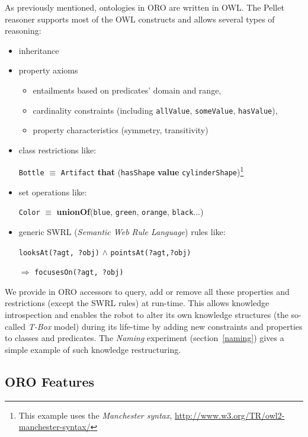 \documentclass{svmult}
\newcommand{\concept}[1]{{\footnotesize \texttt{#1}}}
\begin{document}
As previously mentioned, ontologies in ORO are written in OWL. The
Pellet reasoner supports most of the OWL constructs and allows several types of
reasoning:

\begin{itemize}
	\item inheritance
	\item property axioms
		\begin{itemize}
		\item entailments based on predicates' domain and range,
		\item cardinality constraints (including \concept{allValue}, 
		\concept{someValue}, \concept{hasValue}),
		\item property characteristics (symmetry, transitivity)
		\end{itemize}
	\item class restrictions like: \par \footnotesize \concept{Bottle} $\equiv$
		\concept{Artifact} {\bf that} (\concept{hasShape} {\bf value}
		\concept{cylinderShape})\footnote{This example uses the \emph{Manchester
		syntax}, \url{http://www.w3.org/TR/owl2-manchester-syntax/}} \normalsize
	\item set operations like: \par \footnotesize \concept{Color} $\equiv$ {\bf unionOf}(\concept{blue},
		\concept{green}, \concept{orange}, \concept{black}...) \normalsize
	\item generic SWRL ({\em Semantic Web Rule Language}) rules like: \par
		\footnotesize \concept{looksAt(?agt, ?obj)} $\land$
		\concept{pointsAt(?agt,?obj)} \par $\Rightarrow$ \concept{focusesOn(?agt, ?obj)}
		\normalsize 
	\end{itemize}

We provide in ORO accessors to query, add or remove all these properties and
restrictions (except the SWRL rules) at run-time. This allows
knowledge introspection and enables the robot to alter its own knowledge
structures (the so-called \emph{T-Box} model) during its life-time by adding
new constraints and properties to classes and predicates.
The \emph{Naming} experiment (section~\ref{naming}) gives a simple example of
such knowledge restructuring.

\subsection{ORO Features}
\label{features}
\end{document}
